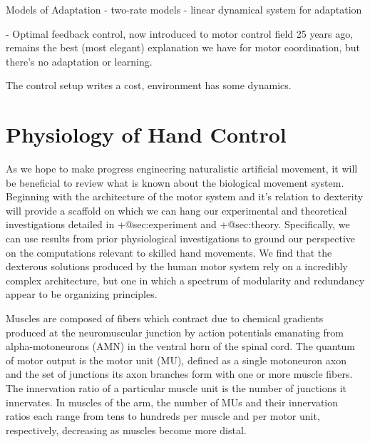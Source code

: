 \documentclass[../main.tex]{subfiles}
\begin{document}
Models of Adaptation
- two-rate models \cite{smithInteractingAdaptiveProcesses2006}
- linear dynamical system for adaptation \cite{chengModelingSensorimotorLearning}


- Optimal feedback control, now introduced to motor control field 25 years ago, remains the best (most elegant) explanation we have for motor coordination, but there's no adaptation or learning.

The control setup writes a cost, environment has some dynamics.




\section{Physiology of Hand Control}


  

As we hope to make progress engineering naturalistic artificial movement, it will be beneficial to review what is known about the biological movement system. Beginning with the architecture of the motor system and it's relation to dexterity will provide a scaffold on which we can hang our experimental and theoretical investigations detailed in {+@sec:experiment} and {+@sec:theory}. Specifically, we can use results from prior physiological investigations to ground our perspective on the computations relevant to skilled hand movements. We find that the dexterous solutions produced by the human motor system rely on a incredibly complex architecture, but one in which a spectrum of modularity and redundancy appear to be organizing principles. 

Muscles are composed of fibers which contract due to chemical gradients produced at the neuromuscular junction by action potentials emanating from alpha-motoneurons (AMN) in the ventral horn of the spinal cord. The quantum of motor output is the motor unit (MU), defined as a single motoneuron axon and the set of junctions its axon branches form with one or more muscle fibers. The innervation ratio of a particular muscle unit is the number of junctions it innervates. In muscles of the arm, the number of MUs and their innervation ratios each range from tens to hundreds per muscle and per motor unit, respectively, decreasing as muscles become more distal. 
\end{document}
